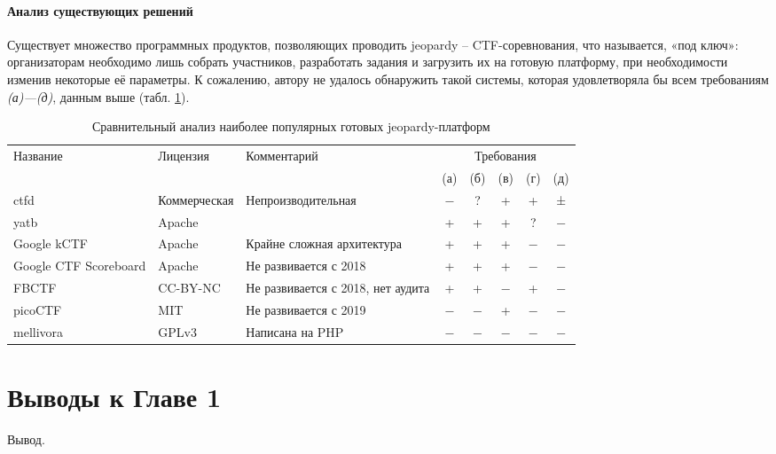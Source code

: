 \subsubsection{Анализ существующих решений}

Существует множество программных продуктов, позволяющих проводить jeopardy -- CTF-соревнования, что называется, «под ключ»: организаторам необходимо лишь собрать участников, разработать задания и загрузить их на готовую платформу, при необходимости изменив некоторые её параметры. К сожалению, автору не удалось обнаружить такой системы, которая удовлетворяла бы всем требованиям \textit{(а)---(д)}, данным выше (табл. \ref{tab:boards}).

\begin{center}
  \begin{longtable}{|p{}|p{}|p{}|c|c|c|c|c|}
    \caption{Сравнительный анализ наиболее популярных готовых jeopardy-платформ}
    \label{tab:boards}
    \\ \hline
    \multirow{2}{*}{Название} & \multirow{2}{*}{Лицензия} & \multirow{2}{*}{Комментарий} & \multicolumn{5}{c|}{Требования} \\ \cline{4-8}
                              &                           &                              & (а) & (б) & (в) & (г) & (д) \\
    \hline \endhead
    ctfd                  & Коммерческая & \small{Непроизводительная}                     & − & ? & + & + & ± \\
    \hline
    yatb                  & Apache       &                                                & + & + & + & ? & − \\
    \hline
    Google kCTF           & Apache       & \small{Крайне сложная архитектура}             & + & + & + & − & − \\
    \hline
    Google CTF Scoreboard & Apache       & \small{Не развивается с 2018     }             & + & + & + & − & − \\
    \hline
    FBCTF                 & CC-BY-NC     & \small{Не развивается с 2018, нет аудита     } & + & + & − & + & − \\
    \hline
    picoCTF               & MIT          & \small{Не развивается с 2019     }             & − & − & + & − & − \\
    \hline
    mellivora             & GPLv3        & \small{Написана на PHP           }             & − & − & − & − & − \\
    \hline
  \end{longtable}
\end{center}

\chapter*{Выводы к Главе 1}

Вывод.


